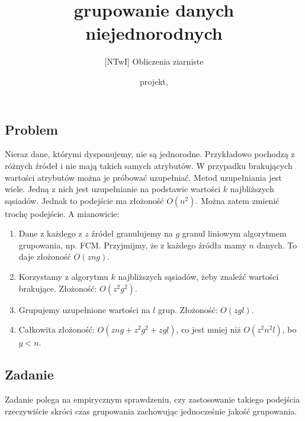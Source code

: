 \documentclass[a4paper,12pt]{article}
\title{\huge\bfseries grupowanie danych niejednorodnych}
\author{[NTwI] Obliczenia ziarniste}
\date{projekt, \the\year}
\begin{document}
\maketitle


\subsection*{Problem}

Nieraz dane, którymi dysponujemy, nie są jednorodne. Przykładowo pochodzą z różnych źródeł i nie mają takich samych atrybutów. 
W przypadku brakujących wartości atrybutów można je próbować uzupełniać. Metod uzupełniania jest wiele. Jedną z nich jest uzupełnianie na podstawie wartości $k$ najbliższych sąsiadów. Jednak to podejście ma złożoność $O(n^2)$. Można zatem zmienić trochę podejście. A mianowicie:
\begin{enumerate}
\item Dane z każdego z $z$ źródeł granulujemy na $g$ granul liniowym algorytmem grupowania, np. FCM. Przyjmijmy, że z każdego źródła mamy $n$ danych.  To daje złożoność $O(zng)$.
\item Korzystamy z algorytmu $k$ najbliższych sąsiadów, żeby znaleźć wartości brakujące. Złożoność: $O(z^2 g^2)$.
\item Grupujemy uzupełnione wartości na $l$ grup. Złożoność: $O(zgl)$.
\item Całkowita złożoność: $O(zng+z^2 g^2+zgl)$, co jest mniej niż $O(z^2n^2l)$,  bo $ g < n$.
\end{enumerate}



\subsection*{Zadanie}
Zadanie polega na empirycznym sprawdzeniu, czy zastosowanie takiego podejścia rzeczywiście skróci czas grupowania zachowując jednocześnie jakość grupowania.
\end{document}
